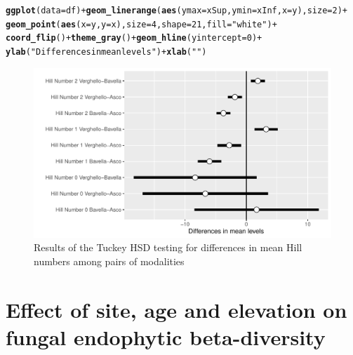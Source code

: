 \documentclass[12pt]{article}\usepackage[]{graphicx}\usepackage[]{color}
\makeatletter
\def\maxwidth{ %
  \ifdim\Gin@nat@width>\linewidth
    \linewidth
  \else
    \Gin@nat@width
  \fi
}
\newcommand{\hlnum}[1]{\textcolor[rgb]{0.686,0.059,0.569}{#1}}%
\newcommand{\hlstr}[1]{\textcolor[rgb]{0.192,0.494,0.8}{#1}}%
\newcommand{\hlopt}[1]{\textcolor[rgb]{0,0,0}{#1}}%
\newcommand{\hlstd}[1]{\textcolor[rgb]{0.345,0.345,0.345}{#1}}%
\newcommand{\hlkwc}[1]{\textcolor[rgb]{0.333,0.667,0.333}{#1}}%
\newcommand{\hlkwd}[1]{\textcolor[rgb]{0.737,0.353,0.396}{\textbf{#1}}}%
\newenvironment{kframe}{%
 \def\at@end@of@kframe{}%
 \ifinner\ifhmode%
  \def\at@end@of@kframe{\end{minipage}}%
  \begin{minipage}{\columnwidth}%
 \fi\fi%
 \def\FrameCommand##1{\hskip\@totalleftmargin \hskip-\fboxsep
 \colorbox{shadecolor}{##1}\hskip-\fboxsep
     \hskip-\linewidth \hskip-\@totalleftmargin \hskip\columnwidth}%
 \MakeFramed {\advance\hsize-\width
   \@totalleftmargin\z@ \linewidth\hsize
   \@setminipage}}%
 {\par\unskip\endMakeFramed%
 \at@end@of@kframe}
\newenvironment{knitrout}{}{} %
\numberwithin{figure}{section}
\makeatother
\begin{document}
\begin{knitrout}\small
{}\color{fgcolor}\begin{kframe}
\begin{alltt}
\hlkwd{ggplot}\hlstd{(}\hlkwc{data} \hlstd{= df)} \hlopt{+} \hlkwd{geom_linerange}\hlstd{(}\hlkwd{aes}\hlstd{(}\hlkwc{ymax} \hlstd{= xSup,} \hlkwc{ymin} \hlstd{= xInf,} \hlkwc{x} \hlstd{= y),} \hlkwc{size} \hlstd{=} \hlnum{2}\hlstd{)} \hlopt{+}
  \hlkwd{geom_point}\hlstd{(}\hlkwd{aes}\hlstd{(}\hlkwc{x}\hlstd{=y,} \hlkwc{y}\hlstd{=x),} \hlkwc{size}\hlstd{=}\hlnum{4}\hlstd{,} \hlkwc{shape}\hlstd{=}\hlnum{21}\hlstd{,} \hlkwc{fill}\hlstd{=}\hlstr{"white"}\hlstd{)} \hlopt{+}
  \hlkwd{coord_flip}\hlstd{()} \hlopt{+} \hlkwd{theme_gray}\hlstd{()} \hlopt{+} \hlkwd{geom_hline}\hlstd{(}\hlkwc{yintercept} \hlstd{=} \hlnum{0}\hlstd{)} \hlopt{+}
  \hlkwd{ylab}\hlstd{(}\hlstr{"Differences in mean levels"}\hlstd{)} \hlopt{+} \hlkwd{xlab}\hlstd{(}\hlstr{""}\hlstd{)}
\end{alltt}
\end{kframe}\begin{figure}

{\centering \includegraphics[width=\maxwidth]{figure/unnamed-chunk-47-1} 

}

\caption[Results of the Tuckey HSD testing for differences in mean Hill numbers among pairs of modalities]{Results of the Tuckey HSD testing for differences in mean Hill numbers among pairs of modalities}\label{fig:unnamed-chunk-47}
\end{figure}


\end{knitrout}


\section{Effect of site, age and elevation on fungal endophytic beta-diversity}
\end{document}
